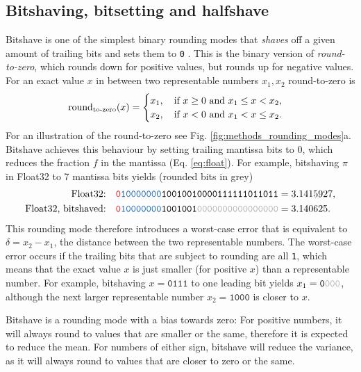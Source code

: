 \subsection{Bitshaving, bitsetting and halfshave}
\label{sec:bitshave}

Bitshave is one of the simplest binary rounding modes that \emph{shaves} off a given amount of trailing bits and sets them to \texttt{0}
\citep{Zender2016,Kouznetsov2020}. This is the binary version of \emph{round-to-zero}, which rounds down for positive values, but
rounds up for negative values. For an exact value $x$ in between two representable numbers $x_1,x_2$ round-to-zero is
\begin{equation}
	\operatorname{round}_{\operatorname{to-zero}}(x) = \begin{cases} x_1, \quad \text{if } x \geq 0 \text{ and } x_1 \leq x < x_2, \\
									x_2, \quad \text{if } x < 0 \text{ and } x_1 < x \leq x_2. \end{cases}
	\label{eq:round_zero}
\end{equation}
For an illustration of the round-to-zero see Fig. \ref{fig:methods_rounding_modes}a. Bitshave achieves this behaviour
by setting trailing mantissa bits to 0, which reduces the fraction $f$ in the mantissa (Eq. \ref{eq:float}). For example,
bitshaving $\pi$ in Float32 to 7 mantissa bits yields (rounded bits in grey)
\begin{align}
	\text{Float32:}& \quad \mathtt{{\color{psign}0}{\color{pexpo}10000000}10010010000111111011011} = 3.1415927, \nonumber \\
	\text{Float32, bitshaved:}& \quad \mathtt{{\color{psign}0}{\color{pexpo}10000000}1001001{\color{gray}0000000000000000}} = 3.140625.
	\label{eq:bitshave}
\end{align}
This rounding mode therefore introduces a worst-case error that is equivalent to $\delta = x_2-x_1$, the distance between the two
representable numbers. The worst-case error occurs if the trailing bits that are subject to rounding are all \texttt{1}, which means
that the exact value $x$ is just smaller (for positive $x$) than a representable number. For example, bitshaving $x = \mathtt{0111}$
to one leading bit yields $x_1 = \mathtt{0{\color{gray}000}}$, although the next larger representable number $x_2 = \mathtt{1000}$
is closer to $x$.

Bitshave is a rounding mode with a bias towards zero: For positive numbers, it will always round to values that are smaller or the
same, therefore it is expected to reduce the mean. For numbers of either sign, bitshave will reduce the variance, as it will always
round to values that are closer to zero or the same.

